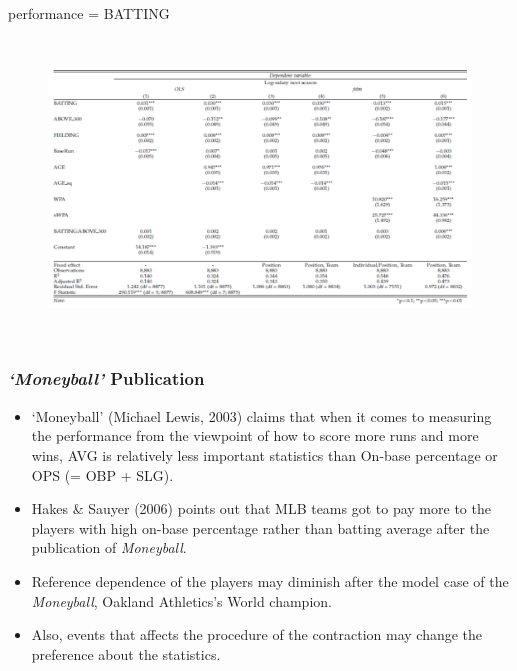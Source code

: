 \documentclass[dvipdfmx,12pt]{beamer}
\begin{document}
\begin{frame}
  \scriptsize
  performance = BATTING

  \begin{figure}
    \includegraphics[width = 12cm, height = 8cm]{fig_tab/mt_tab2.pdf}
\label{}
  \end{figure}
\end{frame}

\begin{frame}\frametitle{\textit{`Moneyball'} Publication}
 \begin{itemize}
   \item `Moneyball' (Michael Lewis, 2003) claims that when it comes to
   measuring the performance from the viewpoint of how to score more runs and
   more wins, AVG is relatively less important statistics than On-base
   percentage or OPS (= OBP + SLG).

   \item Hakes \& Sauyer (2006) points out that MLB teams got to pay more to
   the players with high on-base percentage rather than batting average after
   the publication of \textit{Moneyball}.

   \item Reference dependence of the players may diminish after the model
   case of the \textit{Moneyball}, Oakland Athletics's World champion.

   \item Also, events that affects the procedure of the contraction may
   change the preference about the statistics.
 \end{itemize}
\end{frame}
\end{document}
